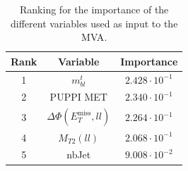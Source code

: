 \documentclass[a4paper, 10pt, openright]{report}
\begin{document}
\begin{table}
\begin{center}
\begin{tabular}{ c|c|c } 
\hline
 Rank & Variable & Importance \\
 \hline
 1 & $m_{bl}^t$ & $2.428 \cdot 10^{-1}$ \\
 2 & \ac{PUPPI} \ac{MET} & $2.340 \cdot 10^{-1}$ \\
 3 & $\Delta \Phi(E_{T}^{\text{miss}}, ll)$ & $2.264 \cdot 10^{-1}$ \\
 4 & $M_{T2}(ll)$ & $2.068 \cdot 10^{-1}$ \\
 5 & nbJet & $9.008 \cdot 10^{-2}$ \\
\hline
\end{tabular}
\caption{Ranking for the importance of the different variables used as input to the \ac{MVA}.}
\label{table:importance}
\end{center}
\end{table}
\end{document}
